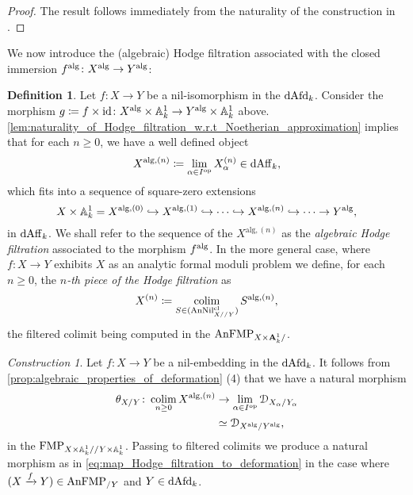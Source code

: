 \documentclass[10pt,a4paper,reqno]{amsart} %
\theoremstyle{plain}
\theoremstyle{definition}
\newtheorem{defin}[thm]{Definition}
\theoremstyle{remark}
\numberwithin{equation}{section}
\newtheorem{construction}[thm]{Construction}
\begin{document}
\begin{proof}
    The result follows immediately from the naturality of the construction in \cite[\S 9.5.1]{Gaitsgory_Study_II}.
\end{proof}

We now introduce the (algebraic) Hodge filtration associated with the closed immersion $f^\mathrm{alg} \colon X^\mathrm{alg} \to Y^\mathrm{alg}$:

\begin{defin} \label{defin:algebraic_Hodge_filtration} Let $f \colon X \to Y$ be a nil-isomorphism in the \infcat $\mathrm{dAfd}_k$.
    Consider the morphism $g \coloneqq f \times \mathrm{id} \colon X^\mathrm{alg} \times \mathbb A^1_k \to Y^\mathrm{alg} \times \mathbb A^1_k$ above. \cref{lem:naturality_of_Hodge_filtration_w.r.t_Noetherian_approximation}
    implies that for each $n \ge 0$, we have a well defined object
        \[
            X^{\mathrm{alg}, (n)} \coloneqq \lim_{\alpha \in I^\mathrm{op}} X_\alpha^{(n)} \in \mathrm{dAff}_k,  
        \]
    which fits into a sequence of square-zero extensions
        \[
            X\times \mathbb A^1_k = X^{ \mathrm{alg}, (0)} \hookrightarrow X^{\mathrm{alg}, (1)}  \hookrightarrow \dots \hookrightarrow X^{\mathrm{alg}, (n)} \hookrightarrow \dots \to Y^\mathrm{alg},
        \]
    in $\mathrm{dAff}_k$. We shall refer to the sequence of the $X^{\mathrm{alg}, (n)}$ as the \emph{algebraic Hodge filtration} associated to the morphism $f^\mathrm{alg}$. 
    In the more general case, where $f \colon X \to Y$ exhibits $X$ as an analytic formal moduli problem we define, for each $n \ge 0$,
    the \emph{$n$-th piece of the Hodge filtration} as 
        \[
            X^{(n)} \coloneqq \operatorname*{colim}_{S \in (\mathrm{AnNil}^{\mathrm{cl}}_{X/ /Y})} S^{\mathrm{alg}, (n)}, 
        \]
    the filtered colimit being computed in the \infcat $\mathrm{AnFMP}_{X \times \mathbf A^1_k/ }$.
\end{defin}

\begin{construction} Let $f \colon X \to Y$ be a nil-embedding in the \infcat $\mathrm{dAfd}_k$. 
    It follows from \cref{prop:algebraic_properties_of_deformation} (4) that we have a natural morphism
        \begin{align} \label{eq:map_Hodge_filtration_to_deformation}
            \theta_{X/ Y} \colon \operatorname*{colim}_{n \ge 0} X^{\mathrm{alg}, (n)} & \to \lim_{\alpha \in I^\mathrm{op}} \mathcal D_{X_\alpha/ Y_\alpha} \\
                                                                        & \simeq \mathcal D_{X^\mathrm{alg}/ Y^\mathrm{alg}},
        \end{align}
    in the \infcat $\mathrm{FMP}_{X \times \mathbb A^1_k/ /Y \times \mathbb A^1_k}$. Passing to filtered colimits we produce a natural
    morphism as in \eqref{eq:map_Hodge_filtration_to_deformation} in the case where $(X \xrightarrow{f} Y) \in \mathrm{AnFMP}_{/ Y}$ and $Y \in \mathrm{dAfd}_k$.
\end{construction}
\end{document}
